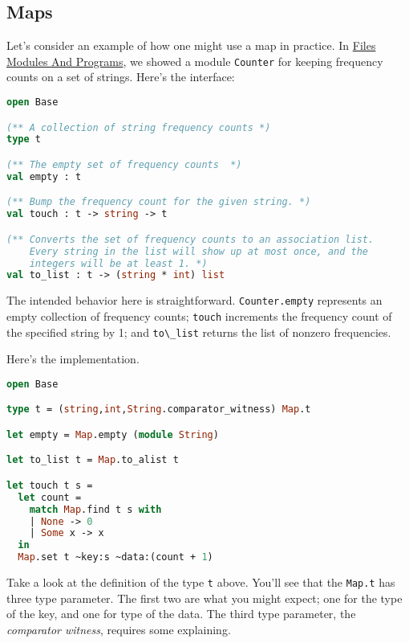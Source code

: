 \hypertarget{maps}{%
\subsection{Maps}\label{maps}}

Let's consider an example of how one might use a map in practice. In
\href{files-modules-and-programs.html\#files-modules-and-programs}{Files
Modules And Programs}, we showed a module
\passthrough{\lstinline!Counter!} for keeping frequency counts on a set
of strings. Here's the interface:

\begin{lstlisting}[language=Caml]
open Base

(** A collection of string frequency counts *)
type t

(** The empty set of frequency counts  *)
val empty : t

(** Bump the frequency count for the given string. *)
val touch : t -> string -> t

(** Converts the set of frequency counts to an association list.
    Every string in the list will show up at most once, and the
    integers will be at least 1. *)
val to_list : t -> (string * int) list
\end{lstlisting}

The intended behavior here is straightforward.
\passthrough{\lstinline!Counter.empty!} represents an empty collection
of frequency counts; \passthrough{\lstinline!touch!} increments the
frequency count of the specified string by 1; and
\passthrough{\lstinline!to\_list!} returns the list of nonzero
frequencies.

Here's the implementation.

\begin{lstlisting}[language=Caml]
open Base

type t = (string,int,String.comparator_witness) Map.t

let empty = Map.empty (module String)

let to_list t = Map.to_alist t

let touch t s =
  let count =
    match Map.find t s with
    | None -> 0
    | Some x -> x
  in
  Map.set t ~key:s ~data:(count + 1)
\end{lstlisting}

Take a look at the definition of the type \passthrough{\lstinline!t!}
above. You'll see that the \passthrough{\lstinline!Map.t!} has three
type parameter. The first two are what you might expect; one for the
type of the key, and one for type of the data. The third type parameter,
the \emph{comparator witness}, requires some explaining.

